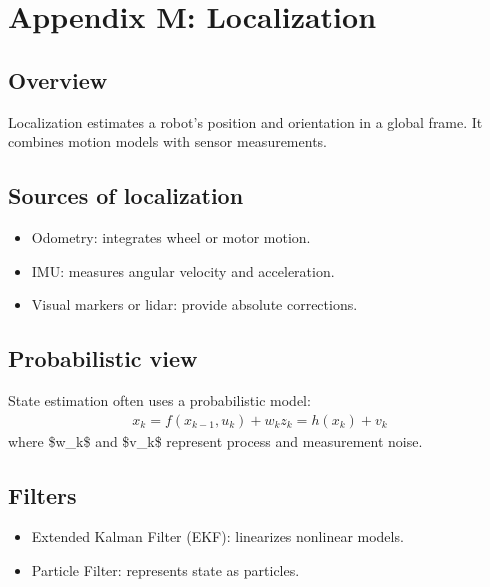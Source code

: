 \documentclass[letterpaper,10pt,english]{sphinxmanual}
\begin{document}
\chapter{Appendix M: Localization}
\label{\detokenize{appendix_m_localization:appendix-m-localization}}\label{\detokenize{appendix_m_localization::doc}}

\section{Overview}
\label{\detokenize{appendix_m_localization:overview}}
\sphinxAtStartPar
Localization estimates a robot’s position and orientation in a global frame.
It combines motion models with sensor measurements.


\section{Sources of localization}
\label{\detokenize{appendix_m_localization:sources-of-localization}}\begin{itemize}
\item {} 
\sphinxAtStartPar
Odometry: integrates wheel or motor motion.

\item {} 
\sphinxAtStartPar
IMU: measures angular velocity and acceleration.

\item {} 
\sphinxAtStartPar
Visual markers or lidar: provide absolute corrections.

\end{itemize}


\section{Probabilistic view}
\label{\detokenize{appendix_m_localization:probabilistic-view}}
\sphinxAtStartPar
State estimation often uses a probabilistic model:
\begin{equation*}
\begin{split}x_k = f(x_{k-1}, u_k) + w_k
z_k = h(x_k) + v_k\end{split}
\end{equation*}
\sphinxAtStartPar
where \$w\_k\$ and \$v\_k\$ represent process and measurement noise.


\section{Filters}
\label{\detokenize{appendix_m_localization:filters}}\begin{itemize}
\item {} 
\sphinxAtStartPar
Extended Kalman Filter (EKF): linearizes nonlinear models.

\item {} 
\sphinxAtStartPar
Particle Filter: represents state as particles.

\end{itemize}
\end{document}
